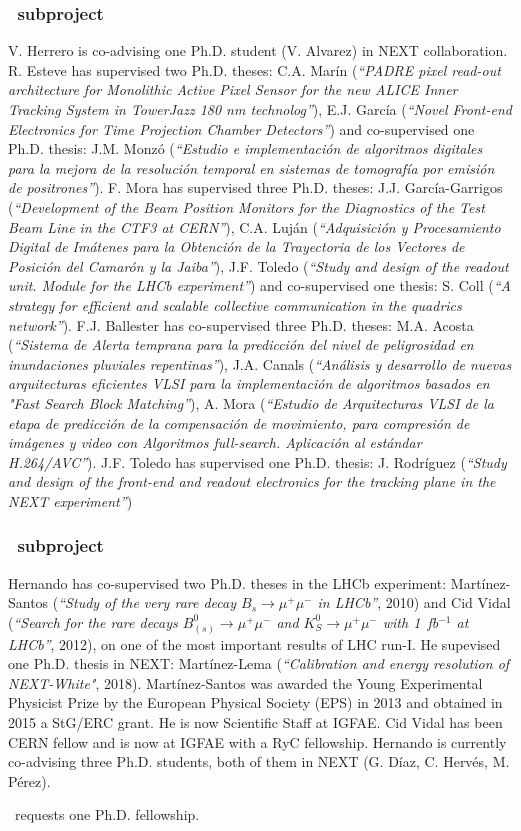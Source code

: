 \subsubsection*{\sUPV\ subproject}
V. Herrero is co-advising one Ph.D. student (V. Alvarez) in NEXT collaboration. R. Esteve has supervised two Ph.D. theses: C.A. Marín ({\it ``PADRE pixel read-out architecture for Monolithic Active Pixel Sensor for the new ALICE Inner Tracking System in TowerJazz 180 nm technolog''}),  E.J. García ({\it ``Novel Front-end Electronics for Time Projection Chamber Detectors''}) and co-supervised one Ph.D. thesis: J.M. Monzó ({\it ``Estudio e implementación de algoritmos digitales para la mejora de la resolución temporal en sistemas de tomografía por emisión de positrones''}). F. Mora has supervised three Ph.D. theses: J.J. García-Garrigos ({\it ``Development of the Beam Position Monitors for the Diagnostics of the Test Beam Line in the CTF3 at CERN''}), C.A. Luján ({\it ``Adquisición y Procesamiento Digital de Imátenes para la Obtención de la Trayectoria de los Vectores de Posición del Camarón y la Jaiba''}), J.F. Toledo ({\it ``Study and design of the readout unit. Module for the LHCb experiment''}) and co-supervised one thesis: S. Coll ({\it ``A strategy for efficient and scalable collective communication in the quadrics network''}). F.J. Ballester has co-supervised three Ph.D. theses: M.A. Acosta ({\it ``Sistema de Alerta temprana para la predicción del nivel de peligrosidad en inundaciones pluviales repentinas''}), J.A. Canals ({\it ``Análisis y desarrollo de nuevas arquitecturas eficientes VLSI para la implementación de algoritmos basados en "Fast Search Block Matching''}), A. Mora ({\it ``Estudio de Arquitecturas VLSI de la etapa de predicción de la compensación de movimiento, para compresión de imágenes y video con Algoritmos full-search. Aplicación al estándar H.264/AVC''}). J.F. Toledo has supervised one Ph.D. thesis: J. Rodríguez ({\it ``Study and design of the front-end and readout electronics for the tracking plane in the NEXT experiment''}) 


\subsubsection*{\sUSC\ subproject}

Hernando has co-supervised two Ph.D. theses in the LHCb experiment: Mart\'{i}nez-Santos ({\it ``Study of the very rare decay $B_s\to\mu^+\mu^-$ in LHCb''}, 2010) and Cid Vidal ({\it ``Search for the rare decays $B^0_{(s)}\to\mu^+\mu^-$ and $K^0_S\to\mu^+\mu^-$ with 1~fb$^{-1}$ at LHCb''}, 2012), on one of the most important results of LHC run-I. He supevised one Ph.D. thesis in NEXT: Mart\'{i}nez-Lema ({\it ``Calibration and energy resolution of NEXT-White"}, 2018). Mart\'{i}nez-Santos was awarded the Young Experimental Physicist Prize by the European Physical Society (EPS) in 2013 and obtained in 2015 a StG/ERC grant. He is now Scientific Staff at IGFAE. Cid Vidal has been CERN fellow and is now at IGFAE with a RyC fellowship. Hernando is currently co-advising three Ph.D. students, both of them in NEXT (G. D\'{i}az, C. Hervés, M. Pérez).

\sUSC\ requests one Ph.D. fellowship.